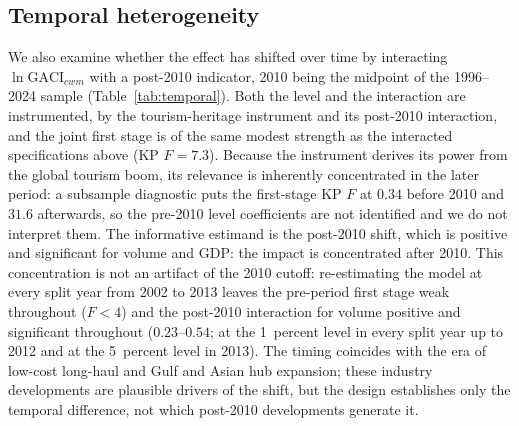 \subsection{Temporal heterogeneity}
\label{sec:temporal}
We also examine whether the effect has shifted over time by interacting
$\ln\mathrm{GACI}_{cwm}$ with a post-2010 indicator, 2010 being the midpoint
of the 1996--2024 sample (Table~\ref{tab:temporal}). Both the level and the
interaction are instrumented, by the tourism-heritage instrument and its
post-2010 interaction, and the joint first stage is of the same modest
strength as the interacted specifications above (KP $F=7.3$). Because the
instrument derives its power from the global tourism boom, its relevance is
inherently concentrated in the later period: a subsample diagnostic puts the
first-stage KP $F$ at $0.34$ before 2010 and $31.6$ afterwards, so the
pre-2010 level coefficients are not identified and we do not interpret them.
The informative estimand is the post-2010 shift, which is positive and
significant for volume and GDP: the impact is concentrated after 2010. This
concentration is not an artifact of the 2010 cutoff: re-estimating the model
at every split year from 2002 to 2013 leaves the pre-period first stage weak
throughout ($F<4$) and the post-2010 interaction for volume positive and significant throughout ($0.23$--$0.54$; at the 1~percent level in every split year up to 2012 and at the 5~percent level in 2013). The timing
coincides with the era of low-cost long-haul and Gulf and Asian hub
expansion; these industry developments are plausible drivers of the shift,
but the design establishes only the temporal difference, not which post-2010
developments generate it.

